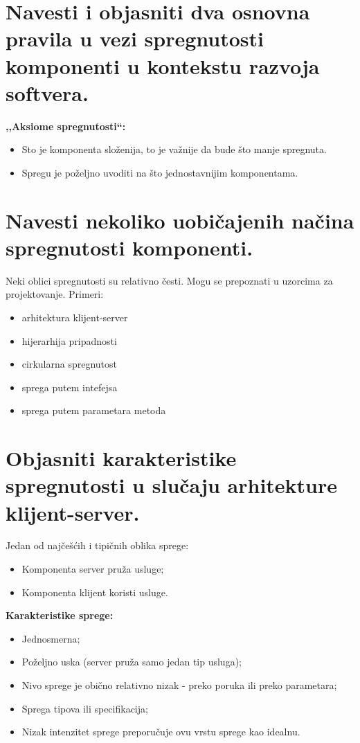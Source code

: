 \documentclass[a4paper]{article}
\begin{document}
\section{Navesti i objasniti dva osnovna pravila u vezi spregnutosti komponenti u 
         kontekstu razvoja softvera.}
  \textbf{,,Aksiome spregnutosti``:}
  \begin{itemize}
    \item Sto je komponenta složenija, to je važnije da bude što manje spregnuta.
    \item Spregu je poželjno uvoditi na što jednostavnijim komponentama.
  \end{itemize}
  
\section{Navesti nekoliko uobičajenih načina spregnutosti komponenti.}
  Neki oblici spregnutosti su relativno česti. 
  Mogu se prepoznati u uzorcima za projektovanje. Primeri:
  \begin{itemize}
    \item arhitektura klijent-server
    \item hijerarhija pripadnosti
    \item cirkularna spregnutost
    \item sprega putem intefejsa
    \item sprega putem parametara metoda
  \end{itemize}

\section{Objasniti karakteristike spregnutosti u slučaju arhitekture klijent-server.}
  \noindent Jedan od najčešćih i tipičnih oblika sprege:
  \begin{itemize}
    \item Komponenta server pruža usluge;
    \item Komponenta klijent koristi usluge.
  \end{itemize}
  \textbf{Karakteristike sprege:}
  \begin{itemize}
    \item Jednosmerna;
    \item Poželjno uska (server pruža samo jedan tip usluga);
    \item Nivo sprege je obično relativno nizak - preko poruka ili preko parametara;
    \item Sprega tipova ili specifikacija;
    \item Nizak intenzitet sprege preporučuje ovu vrstu sprege kao idealnu.
  \end{itemize}
\end{document}

